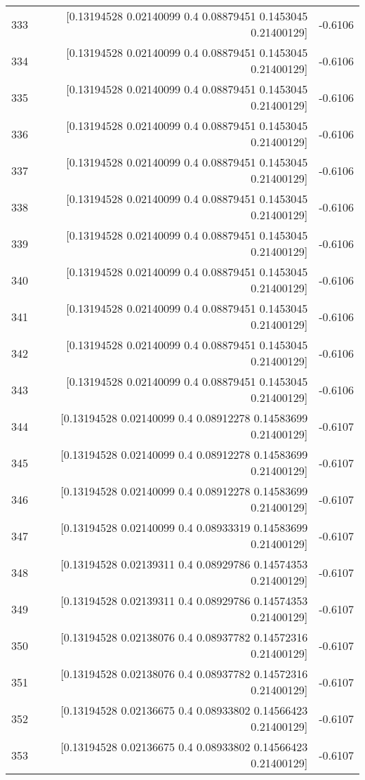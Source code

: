 \begin{longtable}{lrr}
333 & [0.13194528 0.02140099 0.4        0.08879451 0.1453045  0.21400129] & -0.6106 \\
334 & [0.13194528 0.02140099 0.4        0.08879451 0.1453045  0.21400129] & -0.6106 \\
335 & [0.13194528 0.02140099 0.4        0.08879451 0.1453045  0.21400129] & -0.6106 \\
336 & [0.13194528 0.02140099 0.4        0.08879451 0.1453045  0.21400129] & -0.6106 \\
337 & [0.13194528 0.02140099 0.4        0.08879451 0.1453045  0.21400129] & -0.6106 \\
338 & [0.13194528 0.02140099 0.4        0.08879451 0.1453045  0.21400129] & -0.6106 \\
339 & [0.13194528 0.02140099 0.4        0.08879451 0.1453045  0.21400129] & -0.6106 \\
340 & [0.13194528 0.02140099 0.4        0.08879451 0.1453045  0.21400129] & -0.6106 \\
341 & [0.13194528 0.02140099 0.4        0.08879451 0.1453045  0.21400129] & -0.6106 \\
342 & [0.13194528 0.02140099 0.4        0.08879451 0.1453045  0.21400129] & -0.6106 \\
343 & [0.13194528 0.02140099 0.4        0.08879451 0.1453045  0.21400129] & -0.6106 \\
344 & [0.13194528 0.02140099 0.4        0.08912278 0.14583699 0.21400129] & -0.6107 \\
345 & [0.13194528 0.02140099 0.4        0.08912278 0.14583699 0.21400129] & -0.6107 \\
346 & [0.13194528 0.02140099 0.4        0.08912278 0.14583699 0.21400129] & -0.6107 \\
347 & [0.13194528 0.02140099 0.4        0.08933319 0.14583699 0.21400129] & -0.6107 \\
348 & [0.13194528 0.02139311 0.4        0.08929786 0.14574353 0.21400129] & -0.6107 \\
349 & [0.13194528 0.02139311 0.4        0.08929786 0.14574353 0.21400129] & -0.6107 \\
350 & [0.13194528 0.02138076 0.4        0.08937782 0.14572316 0.21400129] & -0.6107 \\
351 & [0.13194528 0.02138076 0.4        0.08937782 0.14572316 0.21400129] & -0.6107 \\
352 & [0.13194528 0.02136675 0.4        0.08933802 0.14566423 0.21400129] & -0.6107 \\
353 & [0.13194528 0.02136675 0.4        0.08933802 0.14566423 0.21400129] & -0.6107 \\

\end{longtable}
